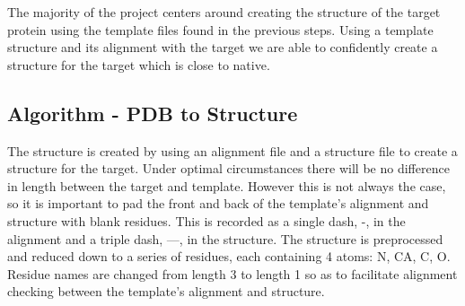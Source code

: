\documentclass{article}
\begin{document}
The majority of the project centers around creating the structure of the target protein using the template files found in the previous steps. Using a template structure and its alignment with the target we are able to confidently create a structure for the target which is close to native.

\subsection{Algorithm - PDB to Structure}

The structure is created by using an alignment file and a structure file to create a structure for the target. Under optimal circumstances there will be no difference in length between the target and template. However this is not always the case, so it is important to pad the front and back of the template's alignment and structure with blank residues. This is recorded as a single dash, -, in the alignment and a triple dash, ---, in the structure. The structure is preprocessed and reduced down to a series of residues, each containing 4 atoms: N, CA, C, O. Residue names are changed from length 3 to length 1 so as to facilitate alignment checking between the template's alignment and structure.

\newpage
\end{document}
